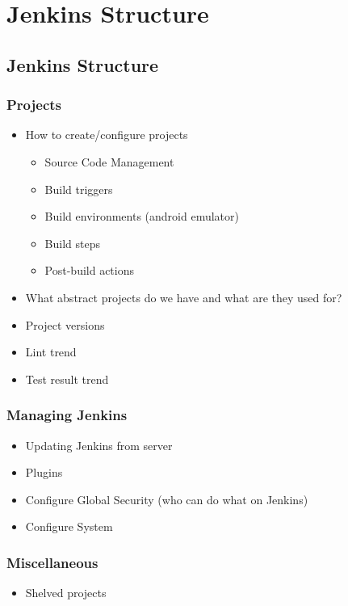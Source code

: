 \chapter{Jenkins Structure}\label{app:jenkins_structure}
\dummy

\section{Jenkins Structure}

\subsection{Projects}
\begin{itemize}
  \item How to create/configure projects
  \begin{itemize}
    \item Source Code Management
    \item Build triggers
    \item Build environments (android emulator)
    \item Build steps
    \item Post-build actions
  \end{itemize}
  \item What abstract projects do we have and what are they used for?
  \item Project versions
  \item Lint trend
  \item Test result trend
\end{itemize}

\subsection{Managing Jenkins}
\begin{itemize}
  \item Updating Jenkins from server
  \item Plugins
  \item Configure Global Security (who can do what on Jenkins)
  \item Configure System
\end{itemize}

\subsection{Miscellaneous}
\begin{itemize}
  \item Shelved projects
\end{itemize}

